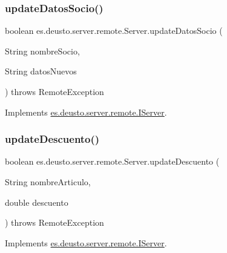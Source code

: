 \mbox{\label{classes_1_1deusto_1_1server_1_1remote_1_1_server_a3e84eab9962a99fa99c02de1000a102a}} 
\subsubsection{\texorpdfstring{updateDatosSocio()}{updateDatosSocio()}}
{\footnotesize\ttfamily boolean es.\+deusto.\+server.\+remote.\+Server.\+update\+Datos\+Socio (\begin{DoxyParamCaption}\item[{String}]{nombre\+Socio,  }\item[{String}]{datos\+Nuevos }\end{DoxyParamCaption}) throws Remote\+Exception}



Implements \mbox{\hyperlink{interfacees_1_1deusto_1_1server_1_1remote_1_1_i_server_a585b4e8eb577808d6b7f0b47d0f7b724}{es.\+deusto.\+server.\+remote.\+I\+Server}}.

\mbox{\label{classes_1_1deusto_1_1server_1_1remote_1_1_server_a376610f3c51b4e545c1618f5e0f32171}} 
\subsubsection{\texorpdfstring{updateDescuento()}{updateDescuento()}}
{\footnotesize\ttfamily boolean es.\+deusto.\+server.\+remote.\+Server.\+update\+Descuento (\begin{DoxyParamCaption}\item[{String}]{nombre\+Articulo,  }\item[{double}]{descuento }\end{DoxyParamCaption}) throws Remote\+Exception}



Implements \mbox{\hyperlink{interfacees_1_1deusto_1_1server_1_1remote_1_1_i_server_ae6b1019df65fbd61a4f35981b883116f}{es.\+deusto.\+server.\+remote.\+I\+Server}}.

